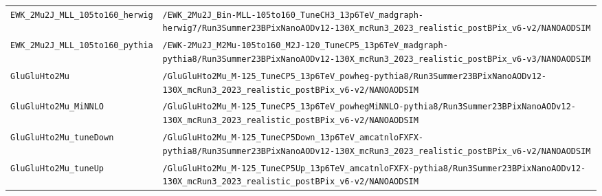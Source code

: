 \begin{longtable}{@{}>{\RaggedRight\arraybackslash}p{} >{\RaggedRight\arraybackslash}p{}@{}}
\addlinespace[2pt]
\texttt{EWK\_\allowbreak{}2Mu2J\_\allowbreak{}MLL\_\allowbreak{}105to160\_\allowbreak{}herwig} & \texttt{/\allowbreak{}EWK\_\allowbreak{}2Mu2J\_\allowbreak{}Bin-\allowbreak{}MLL-\allowbreak{}105to160\_\allowbreak{}TuneCH3\_\allowbreak{}13p6TeV\_\allowbreak{}madgraph-\allowbreak{}herwig7/\allowbreak{}Run3Summer23BPixNanoAODv12-\allowbreak{}130X\_\allowbreak{}mcRun3\_\allowbreak{}2023\_\allowbreak{}realistic\_\allowbreak{}postBPix\_\allowbreak{}v6-\allowbreak{}v2/\allowbreak{}NANOAODSIM} \\
\addlinespace[2pt]
\texttt{EWK\_\allowbreak{}2Mu2J\_\allowbreak{}MLL\_\allowbreak{}105to160\_\allowbreak{}pythia} & \texttt{/\allowbreak{}EWK-\allowbreak{}2Mu2J\_\allowbreak{}M2Mu-\allowbreak{}105to160\_\allowbreak{}M2J-\allowbreak{}120\_\allowbreak{}TuneCP5\_\allowbreak{}13p6TeV\_\allowbreak{}madgraph-\allowbreak{}pythia8/\allowbreak{}Run3Summer23BPixNanoAODv12-\allowbreak{}130X\_\allowbreak{}mcRun3\_\allowbreak{}2023\_\allowbreak{}realistic\_\allowbreak{}postBPix\_\allowbreak{}v6-\allowbreak{}v3/\allowbreak{}NANOAODSIM} \\
\addlinespace[2pt]
\texttt{GluGluHto2Mu} & \texttt{/\allowbreak{}GluGluHto2Mu\_\allowbreak{}M-\allowbreak{}125\_\allowbreak{}TuneCP5\_\allowbreak{}13p6TeV\_\allowbreak{}powheg-\allowbreak{}pythia8/\allowbreak{}Run3Summer23BPixNanoAODv12-\allowbreak{}130X\_\allowbreak{}mcRun3\_\allowbreak{}2023\_\allowbreak{}realistic\_\allowbreak{}postBPix\_\allowbreak{}v6-\allowbreak{}v2/\allowbreak{}NANOAODSIM} \\
\addlinespace[2pt]
\texttt{GluGluHto2Mu\_\allowbreak{}MiNNLO} & \texttt{/\allowbreak{}GluGluHto2Mu\_\allowbreak{}M-\allowbreak{}125\_\allowbreak{}TuneCP5\_\allowbreak{}13p6TeV\_\allowbreak{}powhegMiNNLO-\allowbreak{}pythia8/\allowbreak{}Run3Summer23BPixNanoAODv12-\allowbreak{}130X\_\allowbreak{}mcRun3\_\allowbreak{}2023\_\allowbreak{}realistic\_\allowbreak{}postBPix\_\allowbreak{}v6-\allowbreak{}v2/\allowbreak{}NANOAODSIM} \\
\addlinespace[2pt]
\texttt{GluGluHto2Mu\_\allowbreak{}tuneDown} & \texttt{/\allowbreak{}GluGluHto2Mu\_\allowbreak{}M-\allowbreak{}125\_\allowbreak{}TuneCP5Down\_\allowbreak{}13p6TeV\_\allowbreak{}amcatnloFXFX-\allowbreak{}pythia8/\allowbreak{}Run3Summer23BPixNanoAODv12-\allowbreak{}130X\_\allowbreak{}mcRun3\_\allowbreak{}2023\_\allowbreak{}realistic\_\allowbreak{}postBPix\_\allowbreak{}v6-\allowbreak{}v2/\allowbreak{}NANOAODSIM} \\
\addlinespace[2pt]
\texttt{GluGluHto2Mu\_\allowbreak{}tuneUp} & \texttt{/\allowbreak{}GluGluHto2Mu\_\allowbreak{}M-\allowbreak{}125\_\allowbreak{}TuneCP5Up\_\allowbreak{}13p6TeV\_\allowbreak{}amcatnloFXFX-\allowbreak{}pythia8/\allowbreak{}Run3Summer23BPixNanoAODv12-\allowbreak{}130X\_\allowbreak{}mcRun3\_\allowbreak{}2023\_\allowbreak{}realistic\_\allowbreak{}postBPix\_\allowbreak{}v6-\allowbreak{}v2/\allowbreak{}NANOAODSIM} \\

\end{longtable}
